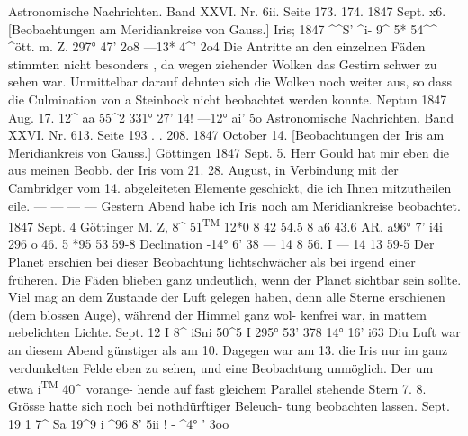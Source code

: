\documentclass[10pt,a4paper]{article}
\begin{document}
Astronomische  Nachrichten.     Band  XXVI.  Nr.  6ii.  Seite  173. 174.     1847  Sept.  x6.
[Beobachtungen  am  Meridiankreise  von  Gauss.]
Iris;  1847  \textasciicircum{}\textasciicircum{}S'  \textasciicircum{}i-     9\textasciicircum{}  5*  \glqq{}  54\textasciicircum{}\textasciicircum{}  \textasciicircum{}ött.  m.  Z.         297°  47'  2o\glqq{}8         ---13*  4\textasciicircum{}'  2o\glqq{}4
Die  Antritte  an  den  einzelnen  Fäden  stimmten  nicht  besonders ,  da  wegen  ziehender  Wolken  das
Gestirn  schwer  zu  sehen  war.  Unmittelbar  darauf  dehnten  sich  die  Wolken  noch  weiter  aus,  so  dass
die  Culmination  von  a  Steinbock  nicht  beobachtet  werden  konnte.
Neptun  1847  Aug.  17.     12\textasciicircum{}  aa\glqq{}  55\textasciicircum{}2        331°  27'  14\glqq{}!         ---12°  ai'  5\glqq{}o
Astronomische  Nachrichten.     Band  XXVI.  Nr.  613. Seite  193  . .  208.     1847  October  14.
[Beobachtungen  der  Iris  am  Meridiankreis  von  Gauss.]
Göttingen  1847  Sept.  5.
Herr  Gould  hat  mir  eben  die  aus  meinen  Beobb.  der  Iris  vom  21.  28.  August,  in  Verbindung  mit
der  Cambridger  vom  14.  abgeleiteten  Elemente  geschickt,  die  ich  Ihnen  mitzutheilen  eile.  ---  ---  ---  ---
Gestern  Abend  habe  ich  Iris  noch  am  Meridiankreise  beobachtet.
1847  Sept.    4
Göttinger  M.  Z,
8\textasciicircum{}  51\textsuperscript{TM}  12*0
8  42  54.5
8     a6     43.6
AR.
a96°  7'  i4\glqq{}i
296  o  46. 5
*95     53     59-8
Declination
-14°     6'     3\glqq{}8
---  14       8     56.  I
---  14     13     59-5
Der  Planet  erschien  bei  dieser  Beobachtung  lichtschwächer  als  bei  irgend  einer  früheren.     Die
Fäden  blieben  ganz  undeutlich,  wenn  der  Planet  sichtbar  sein  sollte.  Viel  mag  an  dem  Zustande  der
Luft  gelegen  haben,  denn  alle  Sterne  erschienen  (dem  blossen  Auge),  während  der  Himmel   ganz  wol-
kenfrei war,  in  mattem  nebelichten  Lichte.
Sept.  12     I     8\glqq{}\textasciicircum{}  iSni  50\textasciicircum{}5      I     295°  53'    37\glqq{}8
14°  16'    i6\glqq{}3
Diu  Luft  war  an  diesem  Abend  günstiger  als  am  10.  Dagegen  war  am  13.  die  Iris  nur  im  ganz
verdunkelten  Felde  eben  zu  sehen,  und  eine  Beobachtung  unmöglich.  Der  um  etwa  i\textsuperscript{TM}  40\textasciicircum{}  vorange-
hende auf  fast  gleichem  Parallel  stehende  Stern  7.  8.  Grösse  hatte  sich  noch  bei  nothdürftiger  Beleuch-
tung beobachten  lassen.
Sept.  19     1     7\textasciicircum{}  Sa\glqq{}\glqq{}  19\textasciicircum{}9     i     \textasciicircum{}96\glqq{}    8'   5i\glqq{}i     !     -  \textasciicircum{}4°  \glqq{}'    3o\glqq{}o
\end{document}
